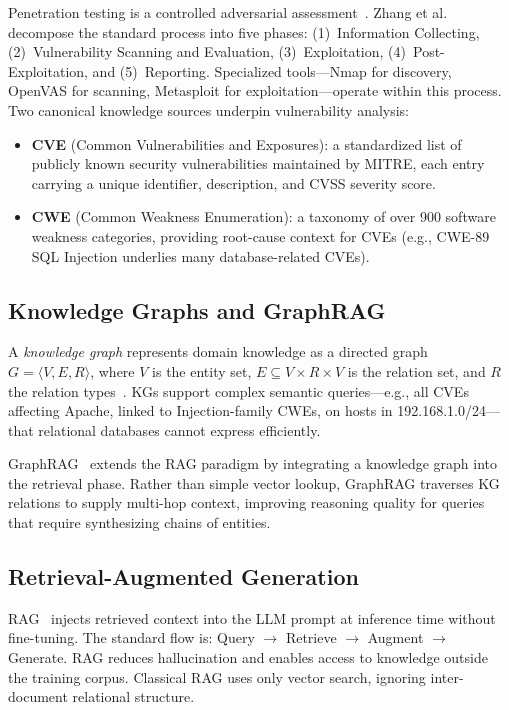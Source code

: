 \documentclass[conference]{IEEEtran}
\begin{document}
Penetration testing is a controlled adversarial assessment~\cite{weidman2014pentest}.
Zhang et al.~\cite{zhang2026pentest} decompose the standard process into five
phases: (1)~Information Collecting, (2)~Vulnerability Scanning and Evaluation,
(3)~Exploitation, (4)~Post-Exploitation, and (5)~Reporting.
Specialized tools—Nmap for discovery, OpenVAS for scanning, Metasploit for
exploitation—operate within this process.
Two canonical knowledge sources underpin vulnerability analysis:
\begin{itemize}
  \item \textbf{CVE} (Common Vulnerabilities and Exposures): a standardized
        list of publicly known security vulnerabilities maintained by MITRE,
        each entry carrying a unique identifier, description, and CVSS severity
        score.
  \item \textbf{CWE} (Common Weakness Enumeration): a taxonomy of over 900
        software weakness categories, providing root-cause context for CVEs
        (e.g., CWE-89 SQL Injection underlies many database-related CVEs).
\end{itemize}

\subsection{Knowledge Graphs and GraphRAG}

A \emph{knowledge graph} represents domain knowledge as a directed graph
$G = \langle V, E, R \rangle$, where $V$ is the entity set,
$E \subseteq V \times R \times V$ is the relation set, and $R$ the relation
types~\cite{hogan2021kgs}.
KGs support complex semantic queries—e.g., all CVEs affecting Apache, linked
to Injection-family CWEs, on hosts in 192.168.1.0/24—that relational databases
cannot express efficiently.

GraphRAG~\cite{edge2024graphrag} extends the RAG paradigm by integrating a
knowledge graph into the retrieval phase.
Rather than simple vector lookup, GraphRAG traverses KG relations to supply
multi-hop context, improving reasoning quality for queries that require
synthesizing chains of entities.

\subsection{Retrieval-Augmented Generation}

RAG~\cite{lewis2020rag} injects retrieved context into the LLM prompt at
inference time without fine-tuning.
The standard flow is: Query $\to$ Retrieve $\to$ Augment $\to$ Generate.
RAG reduces hallucination and enables access to knowledge outside the training
corpus.
Classical RAG uses only vector search, ignoring inter-document relational
structure.
\end{document}
